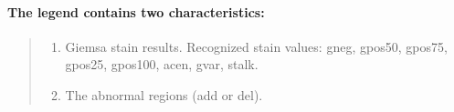 \documentclass[]{article}
\providecommand{\tightlist}{%
  \setlength{\itemsep}{0pt}\setlength{\parskip}{0pt}}
\let\oldparagraph\paragraph
\renewcommand{\paragraph}[1]{\oldparagraph{#1}\mbox{}}
\begin{document}
\hypertarget{the-legend-contains-two-characteristics}{%
\paragraph{The legend contains two
characteristics:}\label{the-legend-contains-two-characteristics}}

\begin{quote}
\begin{enumerate}
\def\labelenumi{\arabic{enumi}.}
\tightlist
\item
  Giemsa stain results. Recognized stain values: gneg, gpos50, gpos75,
  gpos25, gpos100, acen, gvar, stalk.
\item
  The abnormal regions (add or del).
\end{enumerate}
\end{quote}
\end{document}
